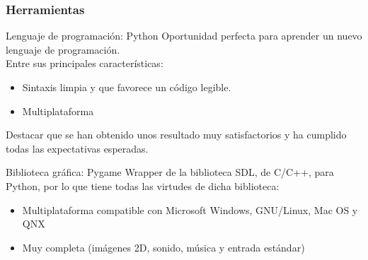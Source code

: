 \begin{frame}
    \frametitle{Herramientas}

        \begin{block}{Lenguaje de programación: Python}
        Oportunidad perfecta para aprender un nuevo lenguaje de programación.\\
        Entre sus principales características:
            \begin{itemize}
                \item Sintaxis limpia y que favorece un código legible.
                \item Multiplataforma
            \end{itemize}
        Destacar que se han obtenido unos resultado muy satisfactorios y ha cumplido todas las expectativas esperadas.

        \end{block}

        \begin{block}{Biblioteca gráfica: Pygame}
        Wrapper de la biblioteca SDL, de C/C++, para Python, por lo que tiene todas las virtudes de dicha biblioteca:
            \begin{itemize}
                \item Multiplataforma compatible con Microsoft Windows, GNU/Linux, Mac OS y QNX
                \item Muy completa (imágenes 2D, sonido, música y entrada estándar)
            \end{itemize}
        \end{block}

\end{frame}

